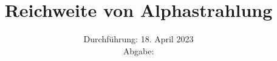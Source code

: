 

\subject{\texorpdfstring{\vspace{2ex}}{}V701\texorpdfstring{\vspace{-2ex}}{}} %
\title{Reichweite von Alphastrahlung} %
\date{
	Durchführung: 18. April 2023 %
	\\ Abgabe:%
}




\maketitle
\thispagestyle{empty}


\tableofcontents
\newpage







\printbibliography{}

\newpage



